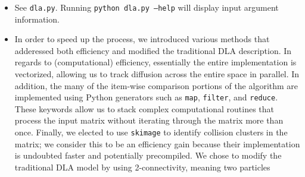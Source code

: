 \documentclass[11pt, oneside]{article}   	%
\begin{document}
\begin{itemize}
\item See \texttt{dla.py}. Running \texttt{python dla.py --help} will display input argument
information.
\item In order to speed up the process, we introduced various methods that adderessed both
efficiency and modified the traditional DLA description. In regards to (computational) efficiency, essentially 
the entire implementation is vectorized, allowing us to track diffusion across the entire space in parallel. 
In addition, the many of the item-wise comparison portions of the algorithm are implemented using Python generators such as \texttt{map}, \texttt{filter}, and \texttt{reduce}. 
These keywords allow us to stack complex computational routines that process the input matrix without iterating through the matrix more than once. Finally, we elected to use \texttt{skimage} to identify collision clusters in the matrix; we consider this to be an efficiency gain because their implementation is undoubted faster and potentially precompiled. We chose to modify the traditional DLA model by using 2-connectivity, meaning two particles   
\end{itemize}
\end{document}
